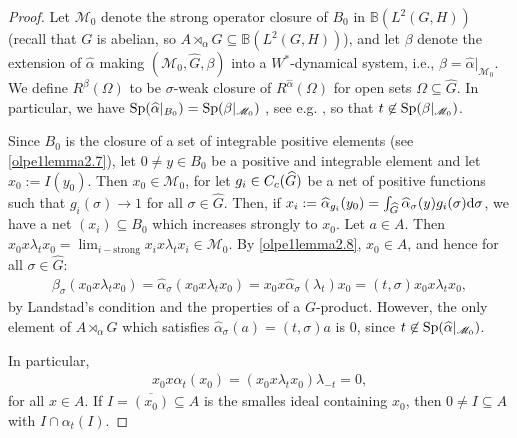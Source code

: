 \begin{proof}
Let $\mathscr{M}_0$ denote the strong operator closure of $B_0$ in $\mathbb{B}(L^2(G,H))$ (recall that $G$ is abelian, so $A \rtimes_\alpha G \subseteq \mathbb{B}(L^2(G,H))$), and let $\beta$ denote the extension of $\hat \alpha$ making $(\mathscr{M}_0, \hat G, \beta)$ into a $W^*$-dynamical system, i.e., $\beta = \hat \alpha|_{\mathscr{M}_0}$. We define $R^{\beta}(\Omega)$ to be $\sigma$-weak closure of $R^{\hat \alpha}(\Omega)$ for open sets $\Omega \subseteq \hat G$. In particular, we have $\mathrm{Sp}(\widehat{\alpha}|_{B_0})= \mathrm{Sp}(\beta|_{\mathscr{M}_0})$ , see e.g. \cite[Proposition 8.8.9]{pedersenalgauto}, so that $t \not \in \mathrm{Sp}(\beta|_{\mathscr{M}_0})$.

Since $B_0$ is the closure of a set of integrable positive elements (see \cref{olpe1lemma2.7}), let $0 \neq y \in B_0$ be a positive and integrable element and let $x_0 := I(y_0)$. Then $x_0 \in \mathscr{M}_0$, for let $g_i \in C_c(\widehat{G})$ be a net of positive functions such that $g_i(\sigma)\to 1$ for all $\sigma \in \hat G$. Then, if $x_i := \widehat{\alpha}_{g_i}(y_0) = \int_{\widehat{G}} \widehat{\alpha}_{\sigma}(y) g_i(\sigma) \mathrm{d} \sigma $, we have a net $(x_i) \subseteq B_0$ which increases strongly to $x_0$. Let $a \in A$. Then $x_0 x \lambda_t x_0 = \lim_{i-\text{strong}} x_i x \lambda_t x_i \in \mathscr{M}_0$. By \cref{olpe1lemma2.8}, $x_0 \in A$, and hence for all $\sigma \in \hat G$:
\begin{align*}
	\beta_{\sigma}(x_0 x \lambda_t x_0) = \hat \alpha_\sigma( x_0 x \lambda_t x_0) = x_0 x \hat \alpha_\sigma(\lambda_t) x_0 =  (t,\sigma) x_0 x \lambda_t x_0,
\end{align*}
by Landstad's condition and the properties of a $G$-product. However, the only element of $A \rtimes_\alpha G$ which satisfies $\hat \alpha_\sigma (a)=(t,\sigma) a$ is $0$, since $t \not \in \mathrm{Sp}(\widehat{\alpha} |_{\mathscr{M}_0})$.

In particular,
\begin{align*}
	x_0 x \alpha_t(x_0) = (x_0 x \lambda_t x_0) \lambda_{-t} = 0,
\end{align*}
for all $x \in A$. If $I = \overline{(x_0)} \subseteq A$ is the smalles ideal containing $x_0$, then $0 \neq I \subseteq A$ with $I \cap \alpha_t(I)$.
\end{proof}


